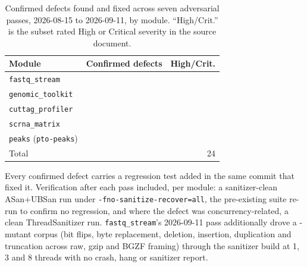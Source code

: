 \begin{table}[t]
\centering
\caption{Confirmed defects found and fixed across seven adversarial passes,
2026-08-15 to 2026-09-11, by module. ``High/Crit.'' is the subset rated High
or Critical severity in the source document.}
\label{tab:audit-summary}
\small
\begin{tabular}{lrr}
\toprule
Module & Confirmed defects & High/Crit. \\
\midrule
\texttt{fastq\_stream} & \NumDefectsFastqTotal{} & \NumDefectsFastqHighCrit{} \\
\texttt{genomic\_toolkit} & \NumDefectsGtkTotal{} & \NumDefectsGtkHighCrit{} \\
\texttt{cuttag\_profiler} & \NumDefectsCuttagTotal{} & \NumDefectsCuttagHighCrit{} \\
\texttt{scrna\_matrix} & \NumDefectsScrnaTotal{} & \NumDefectsScrnaHighCrit{} \\
\texttt{peaks} (\texttt{pto-peaks}) & \NumDefectsPeaksTotal{} & \NumDefectsPeaksHighCrit{} \\
\midrule
Total & \NumAuditTotal{} & 24 \\
\bottomrule
\end{tabular}

\vspace{4pt}
\raggedright\footnotesize
Every confirmed defect carries a regression test added in the same commit
that fixed it. Verification after each pass included, per module: a
sanitizer-clean ASan+UBSan run under \texttt{-fno-sanitize-recover=all}, the
pre-existing suite re-run to confirm no regression, and where the defect was
concurrency-related, a clean ThreadSanitizer run. \texttt{fastq\_stream}'s
2026-09-11 pass additionally drove a \FqFuzzMutants-mutant corpus (bit
flips, byte replacement, deletion, insertion, duplication and truncation
across raw, gzip and BGZF framing) through the sanitizer build at 1, 3 and 8
threads with no crash, hang or sanitizer report.
\end{table}

